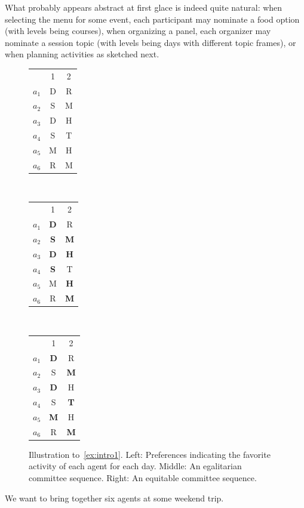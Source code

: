 \documentclass[10pt,a4paper,twocolumn]{article}
\theoremstyle{plain}
\theoremstyle{definition}
\theoremstyle{remark}
\begin{document}
What probably appears abstract at first glace is indeed quite natural:
when selecting the menu for some event, each participant may nominate a food option
(with levels being courses),
%
when organizing a panel, each organizer may nominate a session topic
(with levels being days with different topic frames),
or when planning activities as sketched next.
%
%
%
%
%
%
%
%
%
%
%
%


{\newcommand{\ff}[1]{\cellcolor{blue!25}\bf #1}
\begin{figure}[t]
 \begin{tabular}{l c c}
     ~   &     1 &     2\\
   $a_1$ &     D &     R\\
   $a_2$ &     S &     M\\
   $a_3$ &     D &     H\\
   $a_4$ &     S &     T\\
   $a_5$ &     M &     H\\
   $a_6$ &     R &     M
 \end{tabular}
 ~~~~~
 \begin{tabular}{l c c}
     ~   &     1 &     2\\
   $a_1$ & \ff D &     R\\
   $a_2$ & \ff S & \ff M\\
   $a_3$ & \ff D & \ff H\\
   $a_4$ & \ff S &     T\\
   $a_5$ &     M & \ff H\\
   $a_6$ &     R & \ff M
 \end{tabular}
 ~~~~~
 \begin{tabular}{l c c}
     ~   &     1 &     2\\
   $a_1$ & \ff D &     R\\
   $a_2$ &     S & \ff M\\
   $a_3$ & \ff D &     H\\
   $a_4$ &     S & \ff T\\
   $a_5$ & \ff M &     H\\
   $a_6$ &     R & \ff M
 \end{tabular}
%
%
 \caption{Illustration to~\cref{ex:intro1}.
 Left: Preferences indicating the favorite activity of each agent for each day.
          Middle: An egalitarian committee sequence. Right: An equitable committee sequence.}
 \label{fig:ex1}
\end{figure}
\begin{example}
\label{ex:intro1}
We want to bring together six agents at some weekend trip.

\end{example}}
\end{document}
